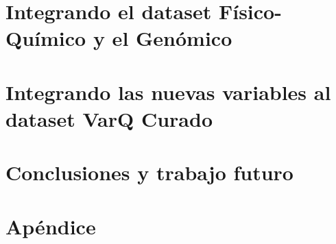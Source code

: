 \documentclass[11pt,a4paper,twoside]{tesis}
\begin{document}
\chapter{Integrando el dataset Físico-Químico y el Genómico}
\label{ch:desarrollo_integral}


\chapter{Integrando las nuevas variables al dataset VarQ Curado}
\label{ch:desarrollo_integral_varq}


\chapter{Conclusiones y trabajo futuro}
\label{ch:conclusiones}



\backmatter





\chapter{Apéndice}
\label{ch:apendice}

\end{document}
